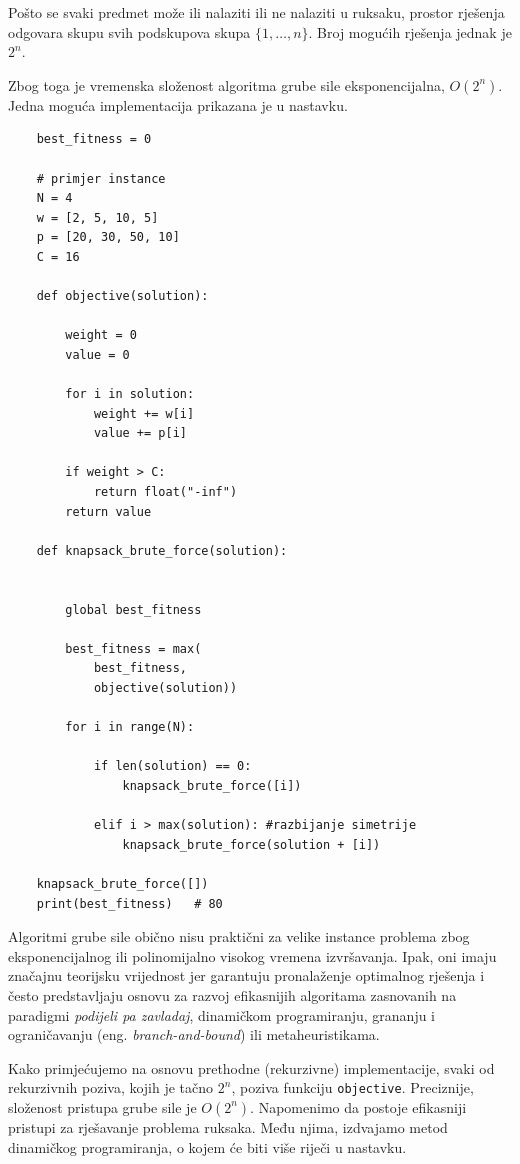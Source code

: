 Pošto se svaki predmet može ili nalaziti ili ne nalaziti u ruksaku, prostor rješenja odgovara skupu svih podskupova skupa $\{1,\ldots,n\}$. Broj mogućih rješenja jednak je $2^n.$

Zbog toga je vremenska složenost algoritma grube sile eksponencijalna, $O(2^n).$\\

Jedna moguća implementacija prikazana je u nastavku.

\begin{verbatim}
	best_fitness = 0
	
	# primjer instance
	N = 4
	w = [2, 5, 10, 5]
	p = [20, 30, 50, 10]
	C = 16
	
	def objective(solution):
	
 	    weight = 0
	    value = 0
	
	    for i in solution:
	        weight += w[i]
	        value += p[i]
	
	    if weight > C:
	        return float("-inf")
	    return value
	
	def knapsack_brute_force(solution):
	
	
	    global best_fitness
	    
	    best_fitness = max(
	        best_fitness,
	        objective(solution))
	
	    for i in range(N):
	
	        if len(solution) == 0:
	            knapsack_brute_force([i])
	
	        elif i > max(solution): #razbijanje simetrije
	            knapsack_brute_force(solution + [i])
	
	knapsack_brute_force([])
	print(best_fitness)   # 80
\end{verbatim}

Algoritmi grube sile obično nisu praktični za velike instance problema zbog eksponencijalnog ili polinomijalno visokog vremena izvršavanja. Ipak, oni imaju značajnu teorijsku vrijednost jer garantuju pronalaženje optimalnog rješenja i često predstavljaju osnovu za razvoj efikasnijih algoritama zasnovanih na paradigmi \emph{podijeli pa zavladaj}, dinamičkom programiranju, grananju i ograničavanju (eng. \emph{branch-and-bound}) ili metaheuristikama.


Kako primjećujemo na osnovu prethodne (rekurzivne) implementacije, svaki od  
rekurzivnih poziva, kojih je tačno $2^n$, poziva funkciju \texttt{objective}. Preciznije, složenost pristupa grube sile je $O(2^n)$. Napomenimo da postoje efikasniji pristupi za rješavanje problema ruksaka. Među njima, izdvajamo metod dinamičkog programiranja, o kojem će biti više riječi u nastavku.


